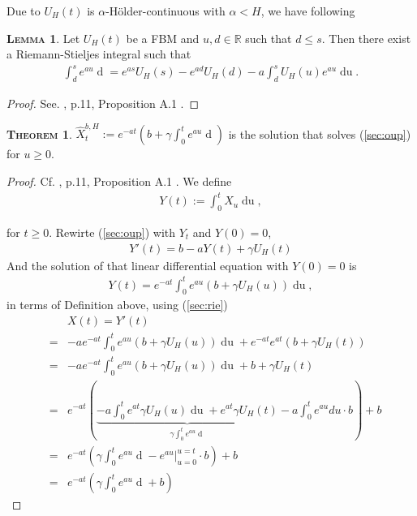 \documentclass[a4paper, twoside, 11pt]{article}
\theoremstyle{definition}
\newtheorem{theorem}[definition]{\scshape Theorem}
\newtheorem{lemma}[definition]{\scshape Lemma}
\newcommand{\brkt}[1]{\left({#1} \right)}
\begin{document}
Due to $U_H(t)$ is $\alpha$-H\"older-continuous with $\alpha < H$, we have following
\begin{lemma}
  Let $U_H(t)$ be a FBM and $u, d\in \mathbb{R}$ such that $d\le s$. Then there exist a Riemann-Stieljes integral such that 
  \begin{eqnarray}
	\int_d^s e^{au} \mathop{dU_H(u)} = e^{as} U_H(s) - e^{ad} U_H(d) - a\int_d^s U_H(u) e^{au}\mathop{du}.
	\label{sec:rie}
  \end{eqnarray}
\end{lemma}

\begin{proof}
  See. \cite{chriel}, p.11, Proposition A.1 .
\end{proof}

\begin{theorem}
  $\hat{X}^{b,H}_t := e^{-at} \brkt{b + \gamma\int_0^t e^{au}\mathop{dU_H(u)}}$ is the solution that solves (\ref{sec:oup}) for $u\ge 0$.
  \label{sec:sol}
\end{theorem}

\begin{proof}
  Cf. \cite{chriel}, p.11, Proposition A.1 . We define
  \begin{eqnarray*}
	Y(t):=\int_0^t X_u \mathop{du},
  \end{eqnarray*}
 
 for $t\ge 0$. Rewirte (\ref{sec:oup}) with $Y_t$ and $Y(0)=0$,
  \begin{eqnarray*}
	Y'(t) = b - aY(t) + \gamma U_H(t)
  \end{eqnarray*}
  And the solution of that linear differential equation with $Y(0)=0$ is
  \begin{eqnarray*}
	Y(t) = e^{-at}\int_0^t e^{au}(b+\gamma U_H(u)) \mathop{du},
  \end{eqnarray*}
  in terms of Definition above, using (\ref{sec:rie})
	\begin{eqnarray*}
	&&X(t) =  Y'(t)\\
	&=& -ae^{-at}\int_0^t e^{au}(b+\gamma U_H(u)) \mathop{du} + e^{-at}e^{at}(b+\gamma U_H(t)) \\
	&=&  -ae^{-at}\int_0^t e^{au}(b+\gamma U_H(u)) \mathop{du} + b +\gamma U_H(t)\\
	&=& e^{-at} \brkt{\underbrace{-a\int_0^t e^{at} \gamma U_H(u) \mathop{du} + e^{at}\gamma U_H(t)}_{\gamma\int_0^t e^{au} \mathop{dU_H(u)}} -a\int_0^t e^{au} du \cdot b } + b\\
  &=&  e^{-at} \brkt{\gamma\int_0^t e^{au} \mathop{dU_H(u)} - e^{au}|^{u=t}_{u=0} \cdot b } + b\\
  &=&  e^{-at} \brkt{\gamma\int_0^t e^{au} \mathop{dU_H(u)} + b}
	\end{eqnarray*}
\end{proof}
\end{document}
